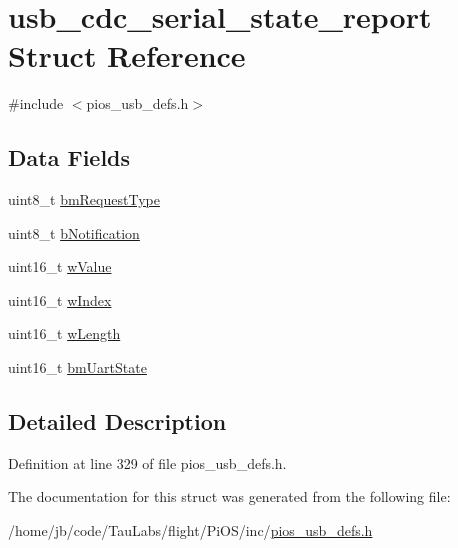 \hypertarget{structusb__cdc__serial__state__report}{\section{usb\-\_\-cdc\-\_\-serial\-\_\-state\-\_\-report \-Struct \-Reference}
\label{structusb__cdc__serial__state__report}
}


{\ttfamily \#include $<$pios\-\_\-usb\-\_\-defs.\-h$>$}

\subsection*{\-Data \-Fields}
\begin{DoxyCompactItemize}
\item 
uint8\-\_\-t \hyperlink{group___p_i_o_s___u_s_b___d_e_f_s_gaaadf08281b8967b649e2ce6cef9f9279}{bm\-Request\-Type}
\item 
uint8\-\_\-t \hyperlink{group___p_i_o_s___u_s_b___d_e_f_s_ga6d3890d58ae8ae0300f94f680f8ca090}{b\-Notification}
\item 
uint16\-\_\-t \hyperlink{group___p_i_o_s___u_s_b___d_e_f_s_ga6049498eadec3759d00a4063f911a58e}{w\-Value}
\item 
uint16\-\_\-t \hyperlink{group___p_i_o_s___u_s_b___d_e_f_s_ga4246e449725cf89b5d38be3b9396a3ca}{w\-Index}
\item 
uint16\-\_\-t \hyperlink{group___p_i_o_s___u_s_b___d_e_f_s_gaae61f52ac5f36605dd23f8a082ae609a}{w\-Length}
\item 
uint16\-\_\-t \hyperlink{group___p_i_o_s___u_s_b___d_e_f_s_gad0e5711c1eafe5a6c8eeeed328cd58e5}{bm\-Uart\-State}
\end{DoxyCompactItemize}


\subsection{\-Detailed \-Description}


\-Definition at line 329 of file pios\-\_\-usb\-\_\-defs.\-h.



\-The documentation for this struct was generated from the following file\-:\begin{DoxyCompactItemize}
\item 
/home/jb/code/\-Tau\-Labs/flight/\-Pi\-O\-S/inc/\hyperlink{pios__usb__defs_8h}{pios\-\_\-usb\-\_\-defs.\-h}\end{DoxyCompactItemize}
